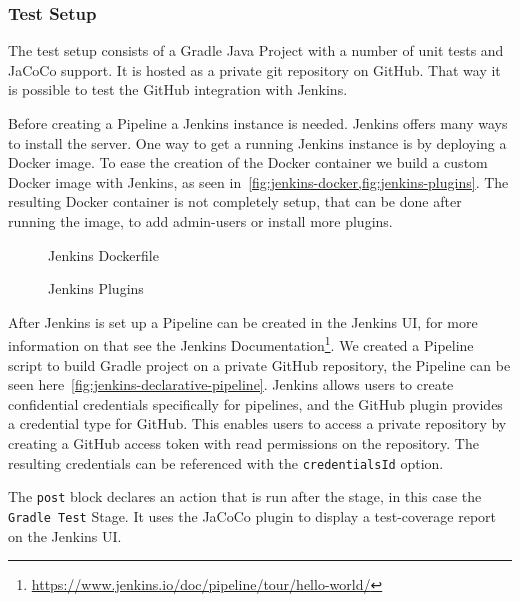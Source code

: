 \subsubsection{Test Setup}\label{subsubsec:testing-jenkins}
The test setup consists of a Gradle Java Project with a number of unit tests and JaCoCo support.
It is hosted as a private git repository on GitHub.
That way it is possible to test the GitHub integration with Jenkins.

Before creating a Pipeline a Jenkins instance is needed.
Jenkins offers many ways to install the server.
One way to get a running Jenkins instance is by deploying a Docker image.
To ease the creation of the Docker container we build a custom Docker image with Jenkins, as seen in\ \ref{fig:jenkins-docker,fig:jenkins-plugins}.
The resulting Docker container is not completely setup, that can be done after running the image, to add admin-users or install more plugins.

\begin{figure}[h]
    \caption{Jenkins Dockerfile}
    
    \label{fig:jenkins-docker}
\end{figure}

\begin{figure}[h]
    \caption{Jenkins Plugins}
    
    \label{fig:jenkins-plugins}
\end{figure}

After Jenkins is set up a Pipeline can be created in the Jenkins UI, for more information on that see the Jenkins Documentation\footnote{\url{https://www.jenkins.io/doc/pipeline/tour/hello-world/}}.
We created a Pipeline script to build Gradle project on a private GitHub repository, the Pipeline can be seen here\ \ref{fig:jenkins-declarative-pipeline}.
Jenkins allows users to create confidential credentials specifically for pipelines, and the GitHub plugin provides a credential type for GitHub.
This enables users to access a private repository by creating a GitHub access token with read permissions on the repository.
The resulting credentials can be referenced with the \texttt{credentialsId} option.

The \texttt{post} block declares an action that is run after the stage, in this case the \texttt{Gradle Test} Stage.
It uses the JaCoCo plugin to display a test-coverage report on the Jenkins UI.

